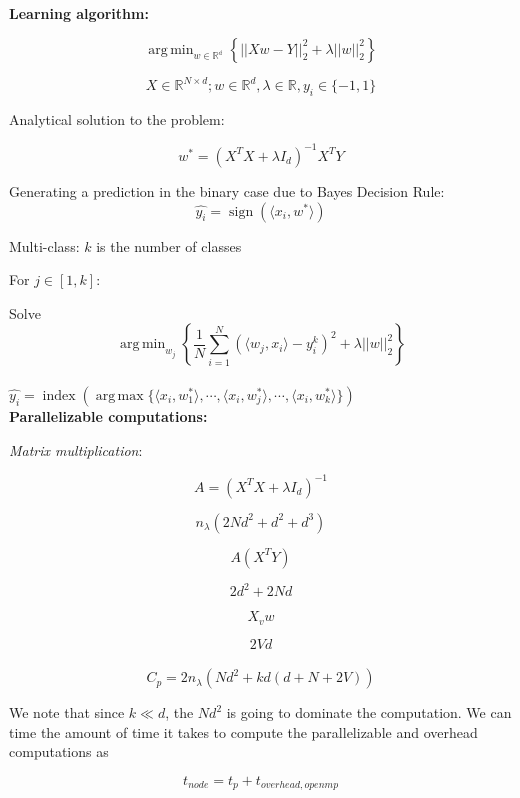 \documentclass[article,12pt]{article}
\DeclareMathOperator*{\argmin}{arg\,min}
\DeclareMathOperator*{\argmax}{arg\,max}
\DeclareMathOperator{\sign}{sign}
\DeclareMathOperator{\ind}{index}
\begin{document}
\textbf{Learning algorithm:}

$$ \argmin_{w \in \mathbb{R^d}} \left\{ ||Xw - Y||_2^2 + \lambda ||w||_2^2 \right\}$$

$$ X \in \mathbb{R}^{N \times d}; w \in \mathbb{R}^d, \lambda \in \mathbb{R}, y_i \in \{-1, 1\}$$

Analytical solution to the problem:

$$ w^* = \left(X^TX + \lambda I_d\right)^{-1} X^T Y$$

Generating a prediction in the binary case due to Bayes Decision Rule:
$$ \hat{y_i} = \sign(\langle x_i, w^* \rangle)$$

Multi-class: $k$ is the number of classes

For $j \in [1, k]$:

Solve 
$$ \argmin_{w_j} \left\{ \frac{1}{N} \sum_{i=1}^N (\langle w_j, x_i \rangle  - y_i^k)^2 + \lambda || w ||_2^2 \right\}$$\\

$\hat{y_i} = \ind \left(\argmax \{ \langle x_i,w_1^* \rangle, \cdots, \langle x_i,w_j^*\rangle, \cdots, \langle x_i,w_k^*\rangle\}\right)$\\

\textbf{Parallelizable computations:}

\textit{Matrix multiplication}:

$$ A = (X^TX + \lambda I_d)^{-1}$$


$$ n_{\lambda}(2Nd^2 + d^2 + d^3) $$



$$ A(X^TY) $$

$$ 2d^2 + 2Nd$$


$$ X_v w $$

$$ 2Vd $$\\


$$C_p = 2n_{\lambda}(Nd^2 + kd(d + N + 2V))$$

We note that since $k \ll d$, the $Nd^2$ is going to dominate the computation. We can time the amount of time it takes to compute the parallelizable and overhead computations as 

$$t_{node} = t_p + t_{overhead, openmp}$$
\end{document}
